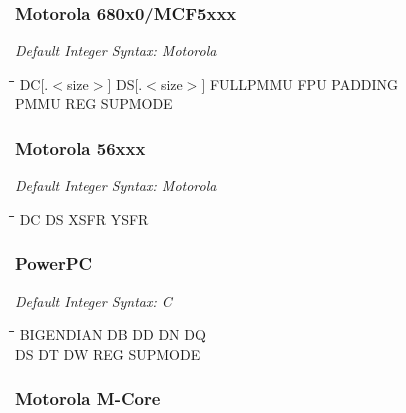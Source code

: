  \subsubsection{Motorola 680x0/MCF5xxx}

{\em Default Integer Syntax: Motorola}

{\tt\begin{tabbing}
\hspace{3cm}\=\hspace{3cm}\=\hspace{3cm}\=\hspace{3cm}\=\kill
DC[.$<$size$>$]\> DS[.$<$size$>$] \> FULLPMMU    \> FPU         \> PADDING \\
PMMU       \> REG         \> SUPMODE \\
\end{tabbing}}

\subsubsection{Motorola 56xxx}

{\em Default Integer Syntax: Motorola}

{\tt\begin{tabbing}
\hspace{3cm}\=\hspace{3cm}\=\hspace{3cm}\=\hspace{3cm}\=\kill
DC         \> DS          \> XSFR        \> YSFR \\
\end{tabbing}}

\subsubsection{PowerPC}

{\em Default Integer Syntax: C}

{\tt\begin{tabbing}
\hspace{3cm}\=\hspace{3cm}\=\hspace{3cm}\=\hspace{3cm}\=\kill
BIGENDIAN  \> DB          \> DD          \> DN          \> DQ \\
DS         \> DT          \> DW          \> REG         \> SUPMODE \\
\end{tabbing}}

\subsubsection{Motorola M-Core}

